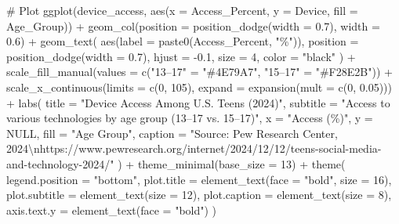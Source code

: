 \documentclass[
  titlepage]{article}
\newenvironment{Shaded}{\begin{snugshade}}{\end{snugshade}}
\newcommand{\AttributeTok}[1]{\textcolor[rgb]{0.40,0.45,0.13}{#1}}
\newcommand{\CommentTok}[1]{\textcolor[rgb]{0.37,0.37,0.37}{#1}}
\newcommand{\ConstantTok}[1]{\textcolor[rgb]{0.56,0.35,0.01}{#1}}
\newcommand{\DecValTok}[1]{\textcolor[rgb]{0.68,0.00,0.00}{#1}}
\newcommand{\FloatTok}[1]{\textcolor[rgb]{0.68,0.00,0.00}{#1}}
\newcommand{\FunctionTok}[1]{\textcolor[rgb]{0.28,0.35,0.67}{#1}}
\newcommand{\NormalTok}[1]{\textcolor[rgb]{0.00,0.23,0.31}{#1}}
\newcommand{\OtherTok}[1]{\textcolor[rgb]{0.00,0.23,0.31}{#1}}
\newcommand{\SpecialCharTok}[1]{\textcolor[rgb]{0.37,0.37,0.37}{#1}}
\newcommand{\StringTok}[1]{\textcolor[rgb]{0.13,0.47,0.30}{#1}}
\begin{document}
\begin{Shaded}
\begin{Highlighting}[]
\CommentTok{\# Plot}
\FunctionTok{ggplot}\NormalTok{(device\_access, }\FunctionTok{aes}\NormalTok{(}\AttributeTok{x =}\NormalTok{ Access\_Percent, }\AttributeTok{y =}\NormalTok{ Device, }\AttributeTok{fill =}\NormalTok{ Age\_Group)) }\SpecialCharTok{+}
  \FunctionTok{geom\_col}\NormalTok{(}\AttributeTok{position =} \FunctionTok{position\_dodge}\NormalTok{(}\AttributeTok{width =} \FloatTok{0.7}\NormalTok{), }\AttributeTok{width =} \FloatTok{0.6}\NormalTok{) }\SpecialCharTok{+}
  \FunctionTok{geom\_text}\NormalTok{(}
    \FunctionTok{aes}\NormalTok{(}\AttributeTok{label =} \FunctionTok{paste0}\NormalTok{(Access\_Percent, }\StringTok{"\%"}\NormalTok{)),}
    \AttributeTok{position =} \FunctionTok{position\_dodge}\NormalTok{(}\AttributeTok{width =} \FloatTok{0.7}\NormalTok{),}
    \AttributeTok{hjust =} \SpecialCharTok{{-}}\FloatTok{0.1}\NormalTok{,}
    \AttributeTok{size =} \DecValTok{4}\NormalTok{,}
    \AttributeTok{color =} \StringTok{"black"}
\NormalTok{  ) }\SpecialCharTok{+}
  \FunctionTok{scale\_fill\_manual}\NormalTok{(}\AttributeTok{values =} \FunctionTok{c}\NormalTok{(}\StringTok{"13–17"} \OtherTok{=} \StringTok{"\#4E79A7"}\NormalTok{, }\StringTok{"15–17"} \OtherTok{=} \StringTok{"\#F28E2B"}\NormalTok{)) }\SpecialCharTok{+}
  \FunctionTok{scale\_x\_continuous}\NormalTok{(}\AttributeTok{limits =} \FunctionTok{c}\NormalTok{(}\DecValTok{0}\NormalTok{, }\DecValTok{105}\NormalTok{), }\AttributeTok{expand =} \FunctionTok{expansion}\NormalTok{(}\AttributeTok{mult =} \FunctionTok{c}\NormalTok{(}\DecValTok{0}\NormalTok{, }\FloatTok{0.05}\NormalTok{))) }\SpecialCharTok{+}
  \FunctionTok{labs}\NormalTok{(}
    \AttributeTok{title =} \StringTok{"Device Access Among U.S. Teens (2024)"}\NormalTok{,}
    \AttributeTok{subtitle =} \StringTok{"Access to various technologies by age group (13–17 vs. 15–17)"}\NormalTok{,}
    \AttributeTok{x =} \StringTok{"Access (\%)"}\NormalTok{,}
    \AttributeTok{y =} \ConstantTok{NULL}\NormalTok{,}
    \AttributeTok{fill =} \StringTok{"Age Group"}\NormalTok{,}
    \AttributeTok{caption =} \StringTok{"Source: Pew Research Center, 2024}\SpecialCharTok{\textbackslash{}n}\StringTok{https://www.pewresearch.org/internet/2024/12/12/teens{-}social{-}media{-}and{-}technology{-}2024/"}
\NormalTok{  ) }\SpecialCharTok{+}
  \FunctionTok{theme\_minimal}\NormalTok{(}\AttributeTok{base\_size =} \DecValTok{13}\NormalTok{) }\SpecialCharTok{+}
  \FunctionTok{theme}\NormalTok{(}
    \AttributeTok{legend.position =} \StringTok{"bottom"}\NormalTok{,}
    \AttributeTok{plot.title =} \FunctionTok{element\_text}\NormalTok{(}\AttributeTok{face =} \StringTok{"bold"}\NormalTok{, }\AttributeTok{size =} \DecValTok{16}\NormalTok{),}
    \AttributeTok{plot.subtitle =} \FunctionTok{element\_text}\NormalTok{(}\AttributeTok{size =} \DecValTok{12}\NormalTok{),}
    \AttributeTok{plot.caption =} \FunctionTok{element\_text}\NormalTok{(}\AttributeTok{size =} \DecValTok{8}\NormalTok{),}
    \AttributeTok{axis.text.y =} \FunctionTok{element\_text}\NormalTok{(}\AttributeTok{face =} \StringTok{"bold"}\NormalTok{)}
\NormalTok{  )}
\end{Highlighting}
\end{Shaded}
\end{document}

